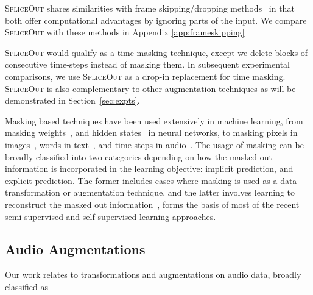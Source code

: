\documentclass{article}
\newcommand{\SpA}{{\textsc{SpliceOut}}\xspace}
\begin{document}
\SpA shares similarities with frame skipping/dropping methods~\cite{dynamicframeskipping,45555,7472084,6639137} in that both offer computational advantages by ignoring parts of the input. We compare \SpA with these methods in Appendix \ref{app:frameskipping}

\SpA would qualify as a time masking technique, except we delete blocks of consecutive time-steps instead of masking them. In subsequent experimental comparisons, we use \SpA as a drop-in replacement for time masking. \SpA is also complementary to other augmentation techniques as will be demonstrated in Section~\ref{sec:expts}. 


\iffalse
Masking based techniques have been used extensively in machine learning, from masking weights~\citep{germain2015made}, and hidden states~\citep{dropout,autodropout,ghiasi2018dropblock,pmlr-v28-wan13} in neural networks, to masking pixels in images~\citep{devries2017improved,Zhong_Zheng_Kang_Li_Yang_2020,8100170,10.1145/344779.344972}, words in text~\citep{devlin2018bert,donahue-etal-2020-enabling,gal2016theoretically}, and time steps in audio~\citep{specaugment,clar}. The usage of masking can be broadly classified into two categories depending on how the masked out information is incorporated in the learning objective: implicit prediction, and explicit prediction. The former includes cases where masking is used as a data transformation or augmentation technique, and the latter involves learning to reconstruct the masked out information~\citep{donahue-etal-2020-enabling,10.1145/344779.344972,devlin2018bert}, forms the basis of most of the recent semi-supervised and self-supervised learning approaches. 

\subsection{Audio Augmentations}
Our work relates to transformations and augmentations on audio data, broadly classified as 
\end{document}
